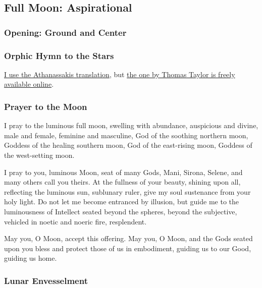 \documentclass[
]{book}
\begin{document}
\hypertarget{full-moon-aspirational}{%
\subsection{Full Moon: Aspirational}\label{full-moon-aspirational}}

\hypertarget{opening-ground-and-center-1}{%
\subsubsection{Opening: Ground and Center}\label{opening-ground-and-center-1}}

\hypertarget{orphic-hymn-to-the-stars}{%
\subsubsection{Orphic Hymn to the Stars}\label{orphic-hymn-to-the-stars}}

\href{https://www.press.jhu.edu/books/title/9661/orphic-hymns}{I use the Athanassakis translation}, but \href{https://www.theoi.com/Text/OrphicHymns1.html\#6}{the one by Thomas Taylor is freely available online}.

\hypertarget{prayer-to-the-moon-1}{%
\subsubsection{Prayer to the Moon}\label{prayer-to-the-moon-1}}

I pray to the luminous full moon,
swelling with abundance,
auspicious and divine,
male and female, feminine and masculine,
God of the soothing northern moon,
Goddess of the healing southern moon,
God of the east-rising moon,
Goddess of the west-setting moon.

I pray to you, luminous Moon, seat of many Gods,
Mani, Sirona, Selene, and many others call you theirs.
At the fullness of your beauty, shining upon all,
reflecting the luminous sun, sublunary ruler,
give my soul sustenance from your holy light.
Do not let me become entranced by illusion,
but guide me to the luminousness of Intellect
seated beyond the spheres, beyond the subjective,
vehicled in noetic and noeric fire, resplendent.

May you, O Moon, accept this offering.
May you, O Moon, and the Gods seated upon you
bless and protect those of us in embodiment,
guiding us to our Good, guiding us home.

\hypertarget{lunar-envesselment}{%
\subsubsection{Lunar Envesselment}\label{lunar-envesselment}}
\end{document}
